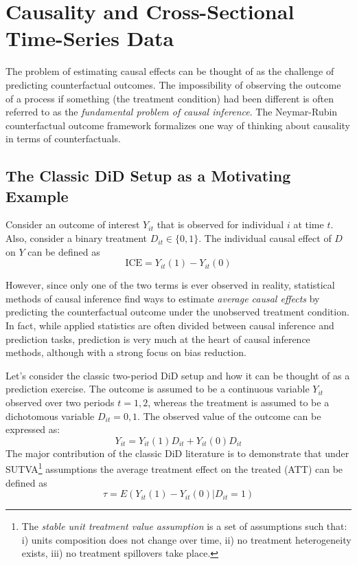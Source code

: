\documentclass[hidelinks]{article}\usepackage[]{graphicx}\usepackage[]{color}
\begin{document}
\section{Causality and Cross-Sectional Time-Series Data}

The problem of estimating causal effects can be thought of as the challenge of predicting counterfactual outcomes. The impossibility of observing the outcome of a process if something (the treatment condition) had been different is often referred to as the \textit{fundamental problem of causal inference}. The Neymar-Rubin counterfactual outcome framework formalizes one way of thinking about causality in terms of counterfactuals. 

\subsection{The Classic DiD Setup as a Motivating Example}

Consider an outcome of interest $Y_{it}$ that is observed for individual $i$ at time $t$. Also, consider a binary treatment $D_{it} \in \{ 0, 1 \}$. The individual causal effect of $D$ on $Y$ can be defined as 
$$\text{ICE} = Y_{it}(1) - Y_{it}(0)$$

However, since only one of the two terms is ever observed in reality, statistical methods of causal inference find ways to estimate \textit{average causal effects} by predicting the counterfactual outcome under the unobserved treatment condition. In fact, while applied statistics are often divided between causal inference and prediction tasks, prediction is very much at the heart of causal inference methods, although with a strong focus on bias reduction.

Let's consider the classic two-period DiD setup and how it can be thought of as a prediction exercise. The outcome is assumed to be a continuous variable $Y_{it}$ observed over two periods $t=1, 2$, whereas the treatment is assumed to be a dichotomous variable $D_{it} = 0, 1$. The observed value of the outcome can be expressed as:
$$ Y_{it} = Y_{it}(1)D_{it} + Y_{it}(0)D_{it} $$
The major contribution of the classic DiD literature \parencite[e.g.,]{Angrist2009} is to demonstrate that under SUTVA\footnote{The \textit{stable unit treatment value assumption} is a set of assumptions such that: i) units composition does not change over time, ii) no treatment heterogeneity exists, iii) no treatment spillovers take place.} assumptions the average treatment effect on the treated (ATT) can be defined as
$$ \tau = E(Y_{it} (1) - Y_{it}(0) | D_{it} = 1) $$
\end{document}

